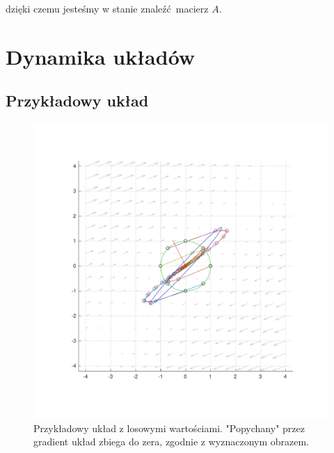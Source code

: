 \documentclass[]{article}
\begin{document}
dzięki czemu jesteśmy w stanie znaleźć macierz $A$.


\section{Dynamika układów}
\subsection{Przykładowy układ}
\begin{figure}[H]
	\centering
	\includegraphics[width=0.99\linewidth]{demo}
	\caption{Przykładowy układ z losowymi wartościami. "Popychany" przez gradient układ zbiega do zera, zgodnie z wyznaczonym obrazem.}
	\label{fig:normal0}
\end{figure}
\end{document}
